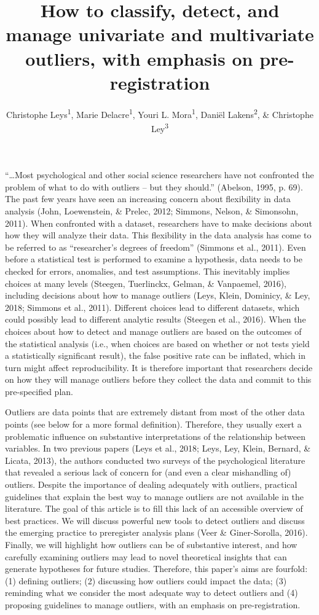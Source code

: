 \documentclass[man,floatsintext]{apa6}
\title{How to classify, detect, and manage univariate and multivariate outliers, with emphasis on pre-registration}
\author{Christophe Leys\textsuperscript{1}, Marie Delacre\textsuperscript{1}, Youri L. Mora\textsuperscript{1}, Daniël Lakens\textsuperscript{2}, \& Christophe Ley\textsuperscript{3}}
\date{}
\affiliation{
\vspace{0.5cm}
\textsuperscript{1} Université Libre de Bruxelles, Service of Analysis of the Data (SAD), Bruxelles, Belgium\\\textsuperscript{2} Eindhoven University of Technology, Human Technology Interaction Group, Eindhoven, the Netherlands\\\textsuperscript{3} Universiteit Gent, Department of Applied Mathematics, Computer Science and Statistics, Gent, Belgium}
\begin{document}
\maketitle

\enquote{\ldots{}Most psychological and other social science researchers have not confronted the problem of what to do with outliers -- but they should.} (Abelson, 1995, p. 69). The past few years have seen an increasing concern about flexibility in data analysis (John, Loewenstein, \& Prelec, 2012; Simmons, Nelson, \& Simonsohn, 2011). When confronted with a dataset, researchers have to make decisions about how they will analyze their data. This flexibility in the data analysis has come to be referred to as \enquote{researcher's degrees of freedom} (Simmons et al., 2011). Even before a statistical test is performed to examine a hypothesis, data needs to be checked for errors, anomalies, and test assumptions. This inevitably implies choices at many levels (Steegen, Tuerlinckx, Gelman, \& Vanpaemel, 2016), including decisions about how to manage outliers (Leys, Klein, Dominicy, \& Ley, 2018; Simmons et al., 2011). Different choices lead to different datasets, which could possibly lead to different analytic results (Steegen et al., 2016). When the choices about how to detect and manage outliers are based on the outcomes of the statistical analysis (i.e., when choices are based on whether or not tests yield a statistically significant result), the false positive rate can be inflated, which in turn might affect reproducibility. It is therefore important that researchers decide on how they will manage outliers before they collect the data and commit to this pre-specified plan.

Outliers are data points that are extremely distant from most of the other data points (see below for a more formal definition). Therefore, they usually exert a problematic influence on substantive interpretations of the relationship between variables. In two previous papers (Leys et al., 2018; Leys, Ley, Klein, Bernard, \& Licata, 2013), the authors conducted two surveys of the psychological literature that revealed a serious lack of concern for (and even a clear mishandling of) outliers. Despite the importance of dealing adequately with outliers, practical guidelines that explain the best way to manage outliers are not available in the literature. The goal of this article is to fill this lack of an accessible overview of best practices. We will discuss powerful new tools to detect outliers and discuss the emerging practice to preregister analysis plans (Veer \& Giner-Sorolla, 2016). Finally, we will highlight how outliers can be of substantive interest, and how carefully examining outliers may lead to novel theoretical insights that can generate hypotheses for future studies. Therefore, this paper's aims are fourfold: (1) defining outliers; (2) discussing how outliers could impact the data; (3) reminding what we consider the most adequate way to detect outliers and (4) proposing guidelines to manage outliers, with an emphasis on pre-registration.
\end{document}
